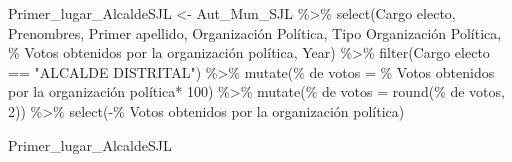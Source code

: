 \documentclass[
]{book}
\newenvironment{Shaded}{\begin{snugshade}}{\end{snugshade}}
\newcommand{\AttributeTok}[1]{\textcolor[rgb]{0.77,0.63,0.00}{#1}}
\newcommand{\DecValTok}[1]{\textcolor[rgb]{0.00,0.00,0.81}{#1}}
\newcommand{\FunctionTok}[1]{\textcolor[rgb]{0.00,0.00,0.00}{#1}}
\newcommand{\NormalTok}[1]{#1}
\newcommand{\OtherTok}[1]{\textcolor[rgb]{0.56,0.35,0.01}{#1}}
\newcommand{\SpecialCharTok}[1]{\textcolor[rgb]{0.00,0.00,0.00}{#1}}
\newcommand{\StringTok}[1]{\textcolor[rgb]{0.31,0.60,0.02}{#1}}
\begin{document}
\begin{Shaded}
\begin{Highlighting}[]
\NormalTok{Primer\_lugar\_AlcaldeSJL }\OtherTok{\textless{}{-}}\NormalTok{ Aut\_Mun\_SJL }\SpecialCharTok{\%\textgreater{}\%} 
  \FunctionTok{select}\NormalTok{(}\StringTok{\textasciigrave{}}\AttributeTok{Cargo electo}\StringTok{\textasciigrave{}}\NormalTok{, }\StringTok{\textasciigrave{}}\AttributeTok{Prenombres}\StringTok{\textasciigrave{}}\NormalTok{, }\StringTok{\textasciigrave{}}\AttributeTok{Primer apellido}\StringTok{\textasciigrave{}}\NormalTok{, }\StringTok{\textasciigrave{}}\AttributeTok{Organización Política}\StringTok{\textasciigrave{}}\NormalTok{, }\StringTok{\textasciigrave{}}\AttributeTok{Tipo Organización Política}\StringTok{\textasciigrave{}}\NormalTok{, }\StringTok{\textasciigrave{}}\AttributeTok{\% Votos obtenidos por la organización política}\StringTok{\textasciigrave{}}\NormalTok{, }\StringTok{\textasciigrave{}}\AttributeTok{Year}\StringTok{\textasciigrave{}}\NormalTok{) }\SpecialCharTok{\%\textgreater{}\%} 
  \FunctionTok{filter}\NormalTok{(}\StringTok{\textasciigrave{}}\AttributeTok{Cargo electo}\StringTok{\textasciigrave{}} \SpecialCharTok{==} \StringTok{"ALCALDE DISTRITAL"}\NormalTok{) }\SpecialCharTok{\%\textgreater{}\%} 
  \FunctionTok{mutate}\NormalTok{(}\StringTok{\textasciigrave{}}\AttributeTok{\% de votos}\StringTok{\textasciigrave{}} \OtherTok{=} \StringTok{\textasciigrave{}}\AttributeTok{\% Votos obtenidos por la organización política}\StringTok{\textasciigrave{}}\SpecialCharTok{*} \DecValTok{100}\NormalTok{) }\SpecialCharTok{\%\textgreater{}\%}
  \FunctionTok{mutate}\NormalTok{(}\StringTok{\textasciigrave{}}\AttributeTok{\% de votos}\StringTok{\textasciigrave{}} \OtherTok{=} \FunctionTok{round}\NormalTok{(}\StringTok{\textasciigrave{}}\AttributeTok{\% de votos}\StringTok{\textasciigrave{}}\NormalTok{, }\DecValTok{2}\NormalTok{)) }\SpecialCharTok{\%\textgreater{}\%}
  \FunctionTok{select}\NormalTok{(}\SpecialCharTok{{-}}\StringTok{\textasciigrave{}}\AttributeTok{\% Votos obtenidos por la organización política}\StringTok{\textasciigrave{}}\NormalTok{)}
\end{Highlighting}
\end{Shaded}

\begin{Shaded}
\begin{Highlighting}[]
\NormalTok{Primer\_lugar\_AlcaldeSJL}
\end{Highlighting}
\end{Shaded}
\end{document}
